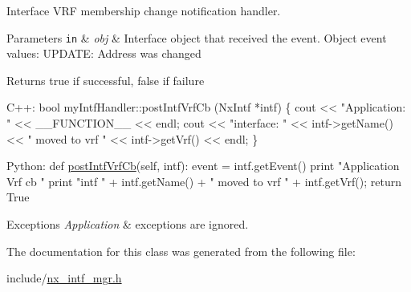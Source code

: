 Interface V\+RF membership change notification handler. 
\begin{DoxyParams}[1]{Parameters}
\mbox{\tt in}  & {\em obj} & Interface object that received the event. Object event values\+: U\+P\+D\+A\+TE\+: Address was changed \\
\hline
\end{DoxyParams}
\begin{DoxyReturn}{Returns}
true if successful, false if failure
\end{DoxyReturn}

\begin{DoxyCode}
C++:
    \textcolor{keywordtype}{bool}  myIntfHandler::postIntfVrfCb (NxIntf *intf)
    \{
        cout << \textcolor{stringliteral}{"Application: "} << \_\_FUNCTION\_\_ << endl;
        cout << \textcolor{stringliteral}{"interface: "} << intf->getName() << 
             \textcolor{stringliteral}{" moved to vrf "} <<  intf->getVrf() << endl;
    \}

Python:   
    def \mbox{\hyperlink{classnxos_1_1_nx_intf_mgr_handler_aa6f8bc5b1cfa6d99e863c8ede3cafa5f}{postIntfVrfCb}}(\textcolor{keyword}{self}, intf):
        event = intf.getEvent()
        print \textcolor{stringliteral}{"Application Vrf cb "} 
        print \textcolor{stringliteral}{"intf "} + intf.getName() + \textcolor{stringliteral}{" moved to vrf "} 
                + intf.getVrf();
        \textcolor{keywordflow}{return} True
\end{DoxyCode}



\begin{DoxyExceptions}{Exceptions}
{\em Application} & exceptions are ignored. \\
\hline
\end{DoxyExceptions}


The documentation for this class was generated from the following file\+:\begin{DoxyCompactItemize}
\item 
include/\mbox{\hyperlink{nx__intf__mgr_8h}{nx\+\_\+intf\+\_\+mgr.\+h}}\end{DoxyCompactItemize}
